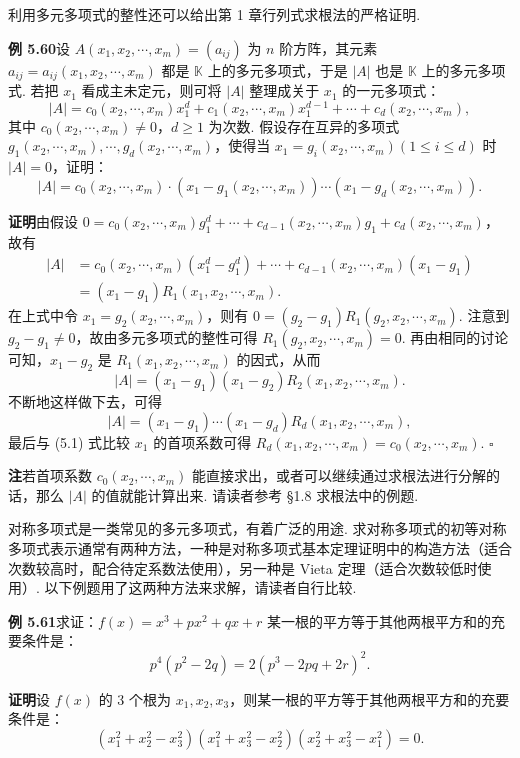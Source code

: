 \documentclass[UTF8,12pt,a4paper,fontset=fandol]{ctexart}
\begin{document}
利用多元多项式的整性还可以给出第 1 章行列式求根法的严格证明.

\noindent\textbf{例 5.60}\quad 设 $A(x_1,x_2,\cdots,x_m)=(a_{ij})$ 为 $n$ 阶方阵，其元素 $a_{ij}=a_{ij}(x_1,x_2,\cdots,x_m)$ 都是 $\mathbb{K}$ 上的多元多项式，于是 $|A|$ 也是 $\mathbb{K}$ 上的多元多项式. 若把 $x_1$ 看成主未定元，则可将 $|A|$ 整理成关于 $x_1$ 的一元多项式：
\begin{equation}
|A|=c_0(x_2,\cdots,x_m)x_1^d+c_1(x_2,\cdots,x_m)x_1^{d-1}+\cdots+c_d(x_2,\cdots,x_m),
\tag{5.1}
\end{equation}
其中 $c_0(x_2,\cdots,x_m)\ne0$，$d\ge1$ 为次数. 假设存在互异的多项式 $g_1(x_2,\cdots,x_m),\cdots,g_d(x_2,\cdots,x_m)$，使得当 $x_1=g_i(x_2,\cdots,x_m)(1\le i\le d)$ 时 $|A|=0$，证明：
\[
|A|=c_0(x_2,\cdots,x_m)\cdot (x_1-g_1(x_2,\cdots,x_m))\cdots (x_1-g_d(x_2,\cdots,x_m)).
\]

\noindent\textbf{证明}\quad 由假设 $0=c_0(x_2,\cdots,x_m)g_1^d+\cdots+c_{d-1}(x_2,\cdots,x_m)g_1+c_d(x_2,\cdots,x_m)$，故有
\[
\begin{aligned}
|A|
&=c_0(x_2,\cdots,x_m)(x_1^d-g_1^d)+\cdots+c_{d-1}(x_2,\cdots,x_m)(x_1-g_1)\\
&=(x_1-g_1)R_1(x_1,x_2,\cdots,x_m).
\end{aligned}
\]
在上式中令 $x_1=g_2(x_2,\cdots,x_m)$，则有 $0=(g_2-g_1)R_1(g_2,x_2,\cdots,x_m)$. 注意到 $g_2-g_1\ne0$，故由多元多项式的整性可得 $R_1(g_2,x_2,\cdots,x_m)=0$. 再由相同的讨论可知，$x_1-g_2$ 是 $R_1(x_1,x_2,\cdots,x_m)$ 的因式，从而
\[
|A|=(x_1-g_1)(x_1-g_2)R_2(x_1,x_2,\cdots,x_m).
\]
不断地这样做下去，可得
\[
|A|=(x_1-g_1)\cdots(x_1-g_d)R_d(x_1,x_2,\cdots,x_m),
\]
最后与 (5.1) 式比较 $x_1$ 的首项系数可得 $R_d(x_1,x_2,\cdots,x_m)=c_0(x_2,\cdots,x_m)$. \hfill $\square$

\noindent\textbf{注}\quad 若首项系数 $c_0(x_2,\cdots,x_m)$ 能直接求出，或者可以继续通过求根法进行分解的话，那么 $|A|$ 的值就能计算出来. 请读者参考 §1.8 求根法中的例题.

对称多项式是一类常见的多元多项式，有着广泛的用途. 求对称多项式的初等对称多项式表示通常有两种方法，一种是对称多项式基本定理证明中的构造方法（适合次数较高时，配合待定系数法使用），另一种是 Vieta 定理（适合次数较低时使用）. 以下例题用了这两种方法来求解，请读者自行比较.

\noindent\textbf{例 5.61}\quad 求证：$f(x)=x^3+px^2+qx+r$ 某一根的平方等于其他两根平方和的充要条件是：
\[
p^4(p^2-2q)=2(p^3-2pq+2r)^2.
\]

\noindent\textbf{证明}\quad 设 $f(x)$ 的 3 个根为 $x_1,x_2,x_3$，则某一根的平方等于其他两根平方和的充要条件是：
\[
(x_1^2+x_2^2-x_3^2)(x_1^2+x_3^2-x_2^2)(x_2^2+x_3^2-x_1^2)=0.
\]
\end{document}
